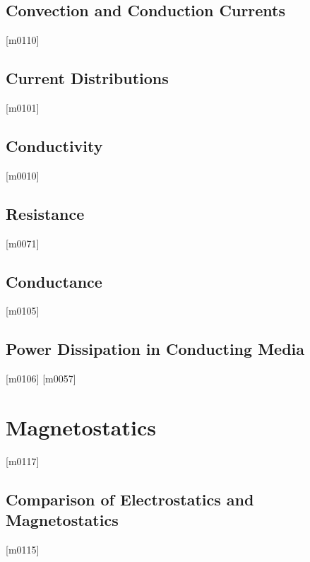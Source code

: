 \documentclass[10pt,letterpaper,twocolumn,openany]{book}
\theoremstyle{definition} %
\begin{document}
    \section{Convection and Conduction Currents}
{\color{blue}\tiny[m0110]}      
      \vfill\break
    \section{Current Distributions}
{\color{blue}\tiny[m0101]}      
      \vfill\break
    \section{Conductivity}
{\color{blue}\tiny[m0010]}      
      \vfill\break
    \section{Resistance}
{\color{blue}\tiny[m0071]}      
      \vfill\break
    \section{Conductance}
{\color{blue}\tiny[m0105]}      
      \vfill\break
    \section{Power Dissipation in Conducting Media}
{\color{blue}\tiny[m0106]}      
{\color{blue}\tiny[m0057]}    
  \chapter{Magnetostatics}
  \thispagestyle{fancy} %
  \fancyhf{}            %
{\color{blue}\tiny[m0117]}    
    \section{Comparison of Electrostatics and Magnetostatics}
{\color{blue}\tiny[m0115]}      
      \vfill\break
\end{document}
